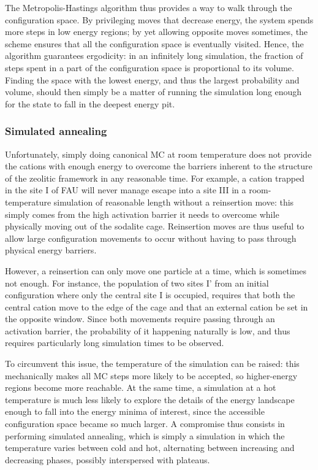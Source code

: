 \documentclass[main.tex]{subfiles}
\begin{document}
The Metropolis-Hastings algorithm thus provides a way to walk through the configuration space. By privileging moves that decrease energy, the system spends more steps in low energy regions; by yet allowing opposite moves sometimes, the scheme ensures that all the configuration space is eventually visited. Hence, the algorithm guarantees ergodicity: in an infinitely long simulation, the fraction of steps spent in a part of the configuration space is proportional to its volume. Finding the space with the lowest energy, and thus the largest probability and volume, should then simply be a matter of running the simulation long enough for the state to fall in the deepest energy pit.


\subsubsection{Simulated annealing}

Unfortunately, simply doing canonical MC at room temperature does not provide the cations with enough energy to overcome the barriers inherent to the structure of the zeolitic framework in any reasonable time. For example, a cation trapped in the site I of FAU will never manage escape into a site III in a room-temperature simulation of reasonable length without a reinsertion move: this simply comes from the high activation barrier it needs to overcome while physically moving out of the sodalite cage. Reinsertion moves are thus useful to allow large configuration movements to occur without having to pass through physical energy barriers.

However, a reinsertion can only move one particle at a time, which is sometimes not enough. For instance, the population of two sites I' from an initial configuration where only the central site I is occupied, requires that both the central cation move to the edge of the cage and that an external cation be set in the opposite window. Since both movements require passing through an activation barrier, the probability of it happening naturally is low, and thus requires particularly long simulation times to be observed.

To circumvent this issue, the temperature of the simulation can be raised: this mechanically makes all MC steps more likely to be accepted, so higher-energy regions become more reachable. At the same time, a simulation at a hot temperature is much less likely to explore the details of the energy landscape enough to fall into the energy minima of interest, since the accessible configuration space became so much larger. A compromise thus consists in performing simulated annealing, which is simply a simulation in which the temperature varies between cold and hot, alternating between increasing and decreasing phases, possibly interspersed with plateaus.
\end{document}
